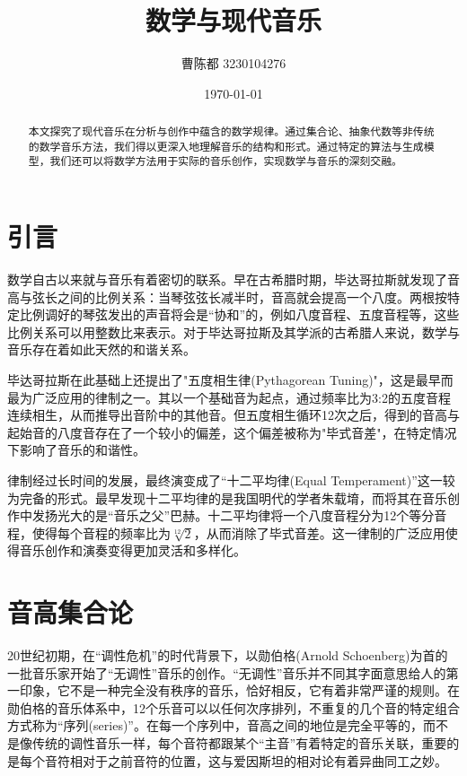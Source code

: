 \documentclass{article}
\title{\textbf{数学与现代音乐}}
\author{曹陈都 3230104276}
\date{\today}
\begin{document}
\maketitle

\begin{abstract}
\label{abstract}
本文探究了现代音乐在分析与创作中蕴含的数学规律。通过集合论、抽象代数等非传统的数学音乐方法，我们得以更深入地理解音乐的结构和形式。通过特定的算法与生成模型，我们还可以将数学方法用于实际的音乐创作，实现数学与音乐的深刻交融。
\end{abstract}

\section{引言}
\label{sec:introduction}
数学自古以来就与音乐有着密切的联系。早在古希腊时期，毕达哥拉斯就发现了音高与弦长之间的比例关系：当琴弦弦长减半时，音高就会提高一个八度\cite{math_history_2017}。两根按特定比例调好的琴弦发出的声音将会是“协和”的，例如八度音程、五度音程等，这些比例关系可以用整数比来表示。对于毕达哥拉斯及其学派的古希腊人来说，数学与音乐存在着如此天然的和谐关系。

毕达哥拉斯在此基础上还提出了"五度相生律(Pythagorean Tuning)"，这是最早而最为广泛应用的律制之一。其以一个基础音为起点，通过频率比为3:2的五度音程连续相生，从而推导出音阶中的其他音。但五度相生循环12次之后，得到的音高与起始音的八度音存在了一个较小的偏差，这个偏差被称为"毕式音差"，在特定情况下影响了音乐的和谐性。

律制经过长时间的发展，最终演变成了“十二平均律(Equal Temperament)”这一较为完备的形式。最早发现十二平均律的是我国明代的学者朱载堉，而将其在音乐创作中发扬光大的是“音乐之父”巴赫。十二平均律将一个八度音程分为12个等分音程，使得每个音程的频率比为$\sqrt[12]{2}$，从而消除了毕式音差。这一律制的广泛应用使得音乐创作和演奏变得更加灵活和多样化\cite{math_art_2021}。

\section{音高集合论}
\label{sec:pitch_set_theory}
20世纪初期，在“调性危机”的时代背景下，以勋伯格(Arnold Schoenberg)为首的一批音乐家开始了“无调性”音乐的创作。“无调性”音乐并不同其字面意思给人的第一印象，它不是一种完全没有秩序的音乐，恰好相反，它有着非常严谨的规则。在勋伯格的音乐体系中，12个乐音可以以任何次序排列，不重复的几个音的特定组合方式称为“序列(series)”。在每一个序列中，音高之间的地位是完全平等的，而不是像传统的调性音乐一样，每个音符都跟某个“主音”有着特定的音乐关联，重要的是每个音符相对于之前音符的位置，这与爱因斯坦的相对论有着异曲同工之妙\cite{how_music_is_made_2021}。
\end{document}

